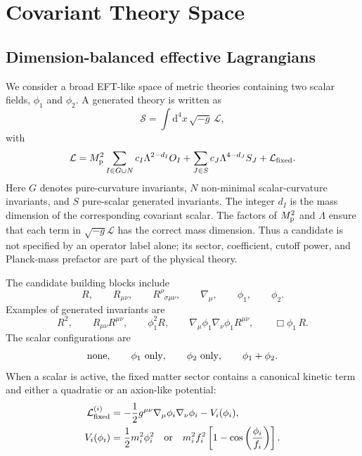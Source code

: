 \documentclass[aps,prd,twocolumn,superscriptaddress,nofootinbib,longbibliography]{revtex4-2}
\newcommand{\dd}{\mathrm{d}}
\newcommand{\Lag}{\mathcal{L}}
\newcommand{\calS}{\mathcal{S}}
\newcommand{\Mp}{M_{\rm p}}
\newcommand{\Lam}{\Lambda}
\begin{document}
\section{Covariant Theory Space}
\label{sec:theory-space}

\subsection{Dimension-balanced effective Lagrangians}
\label{subsec:dimension-balanced}

We consider a broad EFT-like space of metric theories containing two scalar fields, $\phi_1$ and $\phi_2$.  A generated theory is written as
\begin{equation}
\calS=\int \dd^4x\,\sqrt{-g}\,\Lag ,
\label{eq:action}
\end{equation}
with
\begin{equation}
\Lag=
\Mp^2\sum_{I\in G\cup N}
c_I\Lam^{2-d_I}O_I
+
\sum_{J\in S}c_J\Lam^{4-d_J}S_J
+
\Lag_{\rm fixed}.
\label{eq:lagrangian}
\end{equation}
Here $G$ denotes pure-curvature invariants, $N$ non-minimal scalar-curvature invariants, and $S$ pure-scalar generated invariants.  The integer $d_I$ is the mass dimension of the corresponding covariant scalar.  The factors of $\Mp^2$ and $\Lam$ ensure that each term in $\sqrt{-g}\Lag$ has the correct mass dimension.  Thus a candidate is not specified by an operator label alone; its sector, coefficient, cutoff power, and Planck-mass prefactor are part of the physical theory.

The candidate building blocks include
\begin{equation}
R,\qquad R_{\mu\nu},\qquad R^\rho{}_{\sigma\mu\nu},\qquad
\nabla_\mu,\qquad \phi_1,\qquad \phi_2 .
\end{equation}
Examples of generated invariants are
\begin{equation}
R^2,\qquad
R_{\mu\nu}R^{\mu\nu},\qquad
\phi_1^2R,\qquad
\nabla_\mu\phi_1\nabla_\nu\phi_1R^{\mu\nu},\qquad
\Box\phi_1\,R .
\end{equation}
The scalar configurations are
\begin{equation}
\hbox{none},\qquad \phi_1\hbox{ only},\qquad \phi_2\hbox{ only},\qquad \phi_1+\phi_2 .
\end{equation}
When a scalar is active, the fixed matter sector contains a canonical kinetic term and either a quadratic or an axion-like potential:
\begin{align}
\Lag_{\rm fixed}^{(i)}
&=-\frac12 g^{\mu\nu}\nabla_\mu\phi_i\nabla_\nu\phi_i - V_i(\phi_i),\\
V_i(\phi_i)
&=\frac12 m_i^2\phi_i^2
\quad{\rm or}\quad
m_i^2f_i^2\left[1-\cos\left(\frac{\phi_i}{f_i}\right)\right].
\label{eq:fixed-sector}
\end{align}
\end{document}
